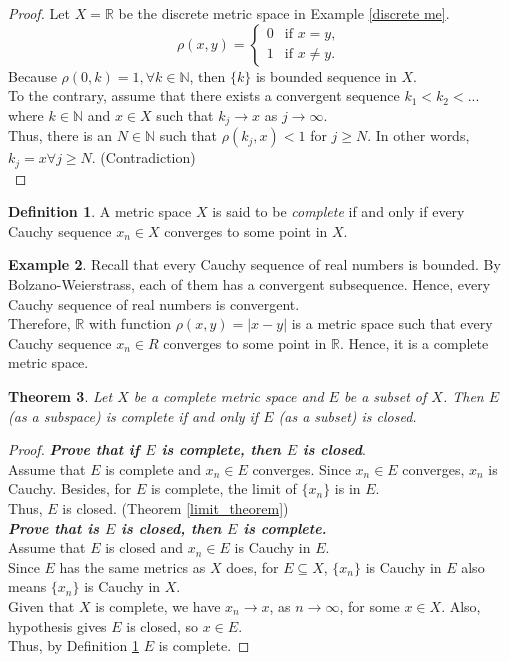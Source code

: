 \documentclass[12pt, reqno]{amsart}
\newtheorem{theorem}{Theorem}[section]
\theoremstyle{definition}
\newtheorem{definition}[theorem]{Definition}
\newtheorem{example}[theorem]{Example}
\numberwithin{equation}{section}
\newcommand{\dR}{{\mathbb R}}
\newcommand{\dN}{{\mathbb N}}
\newcommand{\tab}{\hspace{1cm}}
\begin{document}
\begin{proof}
    Let $X = \dR$ be the discrete metric space in Example \ref{discrete me}.\\
        \begin{equation}
        \rho(x,y)=
        \begin{cases}
            0 & \text{if } x = y,\\
            1 & \text{if } x \neq y.
        \end{cases}
        \end{equation}
Because $\rho(0, k) =1, \forall k \in \dN$, then $\{k\}$ is bounded sequence in $X$.\\
To the contrary, assume that there exists a convergent sequence $k_1<k_2<...$ where $k \in \dN$ and $x \in X$ such that $k_j \rightarrow x$ as $j \rightarrow \infty$.\\
Thus, there is an $N \in \dN$ such that $\rho(k_j,x) <1$ for $j \geq N$. In other words, $k_j = x \forall j \geq N$. (Contradiction)\\
\end{proof}
\begin{definition} \cite{s1}
    A metric space $X$ is said to be \textit{complete} if and only if every Cauchy sequence $x_n \in X$ converges to some point in $X$. \label{complete_thrm}
\end{definition}
\begin{example}
Recall that every Cauchy sequence of real numbers is bounded. By Bolzano-Weierstrass, each of them has a convergent subsequence. Hence, every Cauchy sequence of real numbers is convergent.\\
Therefore, $\dR$ with function $\rho(x,y) = |x-y|$ is a metric space such that every Cauchy sequence $x_n \in R$ converges to some point in $\dR$. Hence, it is a complete metric space.
\end{example}
\begin{theorem} \cite{s1}
    Let $X$ be a complete metric space and $E$ be a subset of $X$. Then $E$ (as a subspace) is complete if and only if $E$ (as a subset) is closed.
\end{theorem}
\begin{proof}
    \textbf{ \textit{Prove that if $E$ is complete, then $E$ is closed}}.\\
    \tab Assume that $E$ is complete and $x_n \in E$ converges. Since $x_n \in E$ converges, $x_n$ is Cauchy. Besides, for $E$ is complete, the limit of $\{x_n\}$ is in $E$.\\
    Thus, $E$ is closed. (Theorem \ref{limit_theorem})\\
    \textbf{ \textit{Prove that is $E$ is closed, then $E$ is complete.}}\\
    \tab Assume that $E$ is closed and $x_n \in E$ is Cauchy in $E$.\\
    Since $E$ has the same metrics as $X$ does, for $E \subseteq X$, $\{x_n\}$ is Cauchy in $E$ also means $\{x_n\}$ is Cauchy in $X$.\\
    Given that $X$ is complete, we have $x_n \rightarrow x$, as $n \rightarrow \infty$, for some $x \in X$. Also, hypothesis gives $E$ is closed, so $x \in E$.\\
    Thus, by Definition \ref{complete_thrm} $E$ is complete.
\end{proof}
\end{document}
